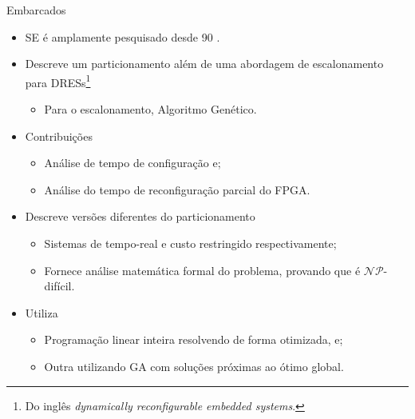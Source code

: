    
   \begin{frame}{Embarcados} \vspace{-1em}
      \begin{itemize}
         \setlength{\itemsep}{1.8em}
         \item SE é amplamente pesquisado desde 90 \cite{Ernst1993, Gupta1995, Hardt1995, Gajski1994, Bolsens1997}.
         
         \item \cite{Mei2000} Descreve um particionamento além de uma abordagem de escalonamento para DRESs\footnote{Do inglês \textit{dynamically reconfigurable embedded systems}.}
         \begin{itemize}
            \item Para o escalonamento, \cite{Mei2000} Algoritmo Genético.
         \end{itemize}
      
         \item Contribuições
         \begin{itemize}
            \setlength{\itemsep}{1.0em}
            \item Análise de tempo de configuração e;
            \item Análise do tempo de reconfiguração parcial do FPGA.
         \end{itemize}
      
      \end{itemize}
   \end{frame}

   \begin{frame}{\cite{Arato2003}} \vspace{-1em}
      \begin{itemize}
         \setlength{\itemsep}{1.8em}
         \item Descreve versões diferentes do particionamento
         \begin{itemize}
            \setlength{\itemsep}{1.0em}
            \item Sistemas de tempo-real e custo restringido respectivamente;
            \item Fornece análise matemática formal do problema, provando que é $ \mathcal{NP} $-difícil.
         \end{itemize} 
      
         \item Utiliza 
         \begin{itemize}
            \setlength{\itemsep}{1.0em}
            \item Programação linear inteira resolvendo de forma otimizada, e;
            \item Outra utilizando GA com soluções próximas ao ótimo global.
         \end{itemize}
      \end{itemize}
   \end{frame}

